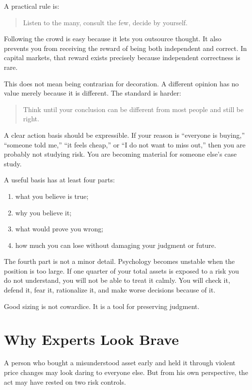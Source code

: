 A practical rule is:

\begin{quote}
Listen to the many, consult the few, decide by yourself.
\end{quote}

Following the crowd is easy because it lets you outsource thought. It also prevents you from receiving the reward of being both independent and correct. In capital markets, that reward exists precisely because independent correctness is rare.

This does not mean being contrarian for decoration. A different opinion has no value merely because it is different. The standard is harder:

\begin{quote}
Think until your conclusion can be different from most people and still be right.
\end{quote}

A clear action basis should be expressible. If your reason is ``everyone is buying,'' ``someone told me,'' ``it feels cheap,'' or ``I do not want to miss out,'' then you are probably not studying risk. You are becoming material for someone else's case study.

A useful basis has at least four parts:

\begin{enumerate}
\item what you believe is true;
\item why you believe it;
\item what would prove you wrong;
\item how much you can lose without damaging your judgment or future.
\end{enumerate}

The fourth part is not a minor detail. Psychology becomes unstable when the position is too large. If one quarter of your total assets is exposed to a risk you do not understand, you will not be able to treat it calmly. You will check it, defend it, fear it, rationalize it, and make worse decisions because of it.

Good sizing is not cowardice. It is a tool for preserving judgment.

\section*{Why Experts Look Brave}

A person who bought a misunderstood asset early and held it through violent price changes may look daring to everyone else. But from his own perspective, the act may have rested on two risk controls.

